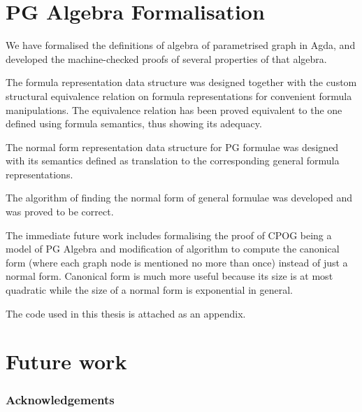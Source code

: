 \section{PG Algebra Formalisation}
We have formalised the definitions of algebra of parametrised graph in Agda, and developed the machine-checked proofs of several properties of that algebra.

The formula representation data structure was designed together with the custom structural equivalence relation on formula representations for convenient formula manipulations. The equivalence relation has been proved equivalent to the one defined using formula semantics, thus showing its adequacy.

The normal form representation data structure for PG formulae was designed with its semantics defined as translation to the corresponding general formula representations.

The algorithm of finding the normal form of general formulae was developed and was proved to be correct.

The immediate future work includes formalising the proof of CPOG being a model of PG Algebra and modification of algorithm to compute the canonical form (where each graph node is mentioned no more than once) instead of just a normal form. Canonical form is much more useful because its size is at most quadratic while the size of a normal form is exponential in general.

The code used in this thesis is attached as an appendix.

\section{Future work}

\subsubsection*{Acknowledgements}

